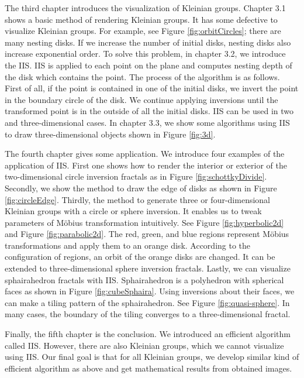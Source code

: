 \documentclass[uplatex, dvipdfmx]{article}
\begin{document}
The third chapter introduces the visualization of Kleinian groups.
Chapter 3.1 shows a basic method of rendering Kleinian groups.
It has some defective to visualize Kleinian groups.
For example, see Figure \ref{fig:orbitCircles}; there are many nesting
disks. If we increase the number of initial disks, nesting disks also
increase exponential order.
To solve this problem, in chapter 3.2, we introduce the IIS.
IIS is applied to each point on the plane and computes nesting depth of
the disk which contains the point.
The process of the algorithm is as follows.
First of all, if the point is contained in one of the initial disks, we invert the
point in the boundary circle of the disk.
We continue applying inversions until the transformed point is in the
outside of all the initial disks.
IIS can be used in two and three-dimensional cases.
In chapter 3.3, we show some algorithms using IIS to draw three-dimensional
objects shown in Figure \ref{fig:3d}.

The fourth chapter gives some application.
We introduce four examples of the application of IIS.
First one shows how to render the interior or exterior of the
two-dimensional circle inversion fractals as in Figure \ref{fig:schottkyDivide}.
Secondly, we show the method to draw the edge of disks as shown in
Figure \ref{fig:circleEdge}.
Thirdly, the method to generate three or four-dimensional Kleinian groups with
a circle or sphere inversion. It enables us to tweak parameters of M\"obius
transformation intuitively.
See Figure \ref{fig:hyperbolic2d} and Figure \ref{fig:parabolic2d}.
The red, green, and blue regions represent M\"obius transformations and
apply them to an orange disk.
According to the configuration of regions, an orbit of the orange disks are
changed.
It can be extended to three-dimensional sphere inversion fractals.
Lastly, we can visualize sphairahedron fractals with IIS.
Sphairahedron is a polyhedron with spherical
faces as shown in Figure \ref{fig:cubeSphaira}.
Using inversions about their faces, we can make a tiling pattern
of the sphairahedron. See Figure \ref{fig:quasi-sphere}.
In many cases, the boundary of the tiling converges to a
three-dimensional fractal. 

Finally, the fifth chapter is the conclusion. We introduced an efficient algorithm
called IIS.
However, there are also Kleinian groups, which we cannot
visualize using IIS.
Our final goal is that for all Kleinian groups, we develop similar kind of
efficient algorithm as above and get mathematical results from obtained images.
\end{document}
